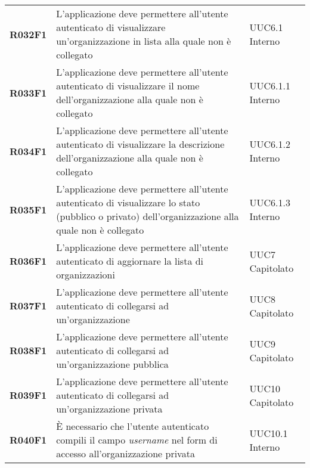 \documentclass[../analisi-dei-requisiti.tex]{subfiles}
\begin{document}
\begin{longtable}[H]{>{\centering\bfseries}m{3cm} >{\centering}m{10cm} >{\centering\arraybackslash}m{3cm}}
  R032F1                               & L'applicazione deve permettere all'utente autenticato di visualizzare un'organizzazione in lista alla quale non è collegato                                                                             & UUC6.1 Interno                \\
  R033F1                               & L'applicazione deve permettere all'utente autenticato di visualizzare il nome dell'organizzazione alla quale non è collegato                                                                            & UUC6.1.1 Interno              \\
  R034F1                               & L'applicazione deve permettere all'utente autenticato di visualizzare la descrizione dell'organizzazione alla quale non è collegato                                                                     & UUC6.1.2 Interno              \\
  R035F1                               & L'applicazione deve permettere all'utente autenticato di visualizzare lo stato (pubblico o privato) dell'organizzazione alla quale non è collegato                                                      & UUC6.1.3 Interno              \\
  R036F1                               & L'applicazione deve permettere all'utente autenticato di aggiornare la lista di organizzazioni                                                                                                          & UUC7 Capitolato               \\
  R037F1                               & L'applicazione deve permettere all'utente autenticato di collegarsi ad un'organizzazione                                                                                                                & UUC8 Capitolato               \\
  R038F1                               & L'applicazione deve permettere all'utente autenticato di collegarsi ad un'organizzazione pubblica                                                                                                       & UUC9 Capitolato               \\
  R039F1                               & L'applicazione deve permettere all'utente autenticato di collegarsi ad un'organizzazione privata                                                                                                        & UUC10 Capitolato              \\
  R040F1                               & È necessario che l'utente autenticato compili il campo \textit{username} nel form di accesso all'organizzazione privata                                                                                 & UUC10.1 Interno               \\

\end{longtable}
\end{document}
